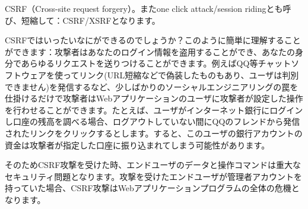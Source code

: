 CSRF（Cross-site request forgery）。またone click attack/session ridingとも呼び、短縮して：CSRF/XSRFとなります。

CSRFではいったいなにができるのでしょうか？このように簡単に理解することができます：攻撃者はあなたのログイン情報を盗用することができ、あなたの身分であらゆるリクエストを送りつけることができます。例えばQQ等チャットソフトウェアを使ってリンク(URL短縮などで偽装したものもあり、ユーザは判別できません)を発信するなど、少しばかりのソーシャルエンジニアリングの罠を仕掛けるだけで攻撃者はWebアプリケーションのユーザに攻撃者が設定した操作を行わせることができます。たとえば、ユーザがインターネット銀行にログインし口座の残高を調べる場合、ログアウトしていない間にQQのフレンドから発信されたリンクをクリックするとします。すると、このユーザの銀行アカウントの資金は攻撃者が指定した口座に振り込まれてしまう可能性があります。

そのためCSRF攻撃を受けた時、エンドユーザのデータと操作コマンドは重大なセキュリティ問題となります。攻撃を受けたエンドユーザが管理者アカウントを持っていた場合、CSRF攻撃はWebアプリケーションプログラムの全体の危機となります。

